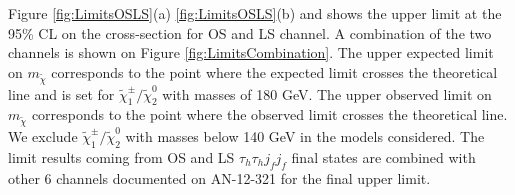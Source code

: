 Figure \ref{fig:LimitsOSLS}(a) \ref{fig:LimitsOSLS}(b) and  shows the upper limit at the 95\% CL on the cross-section for OS and LS channel. A combination of the two channels is shown on Figure \ref{fig:LimitsCombination}. The upper expected limit on $m_{\tilde{\chi}}$ corresponds to the point where the expected limit crosses the theoretical line and is set for  $\tilde{\chi}_{1}^{\pm} /\tilde{\chi}_{2}^{0} $ with masses of 180 GeV. The upper observed limit on $m_{\tilde{\chi}}$ corresponds to the point where the observed limit crosses the theoretical line. We exclude $\tilde{\chi}_{1}^{\pm} /\tilde{\chi}_{2}^{0} $ with masses below 140 GeV in the models considered. The limit results coming from OS and LS $\tau_{h}\tau_{h} j_{f} j_{f}$ final states are combined with other 6 channels documented on AN-12-321 for the final upper limit.


